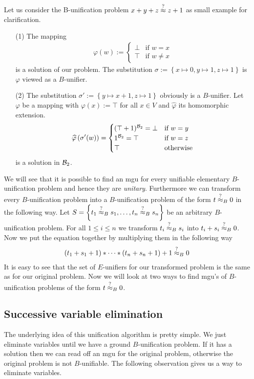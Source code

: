 	Let us consider the B-unification problem $x+y+z\stackrel{?}{\approx} z+1$ as small example for clarification.
	\begin{itemize}
		\item[(1)]The mapping 
		      \begin{align*}
		      	\varphi(w):=\begin{cases}
		      	\bot & \text{if }w=x     \\
		      	\top & \text{if }w\neq x 
		      	\end{cases}
		      \end{align*}is a solution of our problem. The substitution $\sigma:=\left\lbrace x\mapsto0,y\mapsto1,z\mapsto1\right\rbrace$ is $\varphi$ viewed as a $B$-unifier.
		\item[(2)]The substitution $\sigma':=\left\lbrace y\mapsto x+1,z\mapsto 1\right\rbrace $ obviously is a $B$-unifier. Let $\varphi$ be a mapping with $\varphi(x):=\top$ for all $x\in V$ and $\widehat{\varphi}$ its homomorphic extension.
		      \begin{align*}
		      	\widehat{\varphi}\left(\sigma'(w)\right)=\begin{cases}
		      	(\top+1)^{\mathcal{B}_2}=\bot & \text{if } w=y   \\
		      	1^{\mathcal{B}_2}=\top        & \text{if } w=z   \\
		      	\top                & \text{otherwise} 
		      	\end{cases}
		      \end{align*}
		      is a solution in ${\mathcal{B}_2}$.
	\end{itemize}
	We will see that it is possible to find an mgu for every unifiable elementary $B$-unification problem and hence they are \emph{unitary}.
	Furthermore we can transform every $B$-unification problem into a $B$-unification problem of the form $t\stackrel{?}{\approx}_B0$ in the following way. Let $S=\left\lbrace t_1\stackrel{?}{\approx}_Bs_1,\dots,t_n\stackrel{?}{\approx}_Bs_n\right\rbrace$ be an arbitrary $B$-unification problem. For all $1\leq i\leq n$ we transform $t_i\stackrel{?}{\approx}_Bs_i$ into $t_i+s_i\stackrel{?}{\approx}_B0$. Now we put the equation together by multiplying them in the following way 
	\begin{align*}
		(t_1+s_1+1)*\dots*(t_n+s_n+1)+1\stackrel{?}{\approx}_B0 
	\end{align*}
	It is easy to see that the set of $E$-unifiers for our transformed problem is the same as for our original problem. Now we will look at two ways to find mgu's of $B$-unification problems of the form $t\stackrel{?}{\approx}_B0$.
	\subsection{Successive variable elimination}
	The underlying idea of this unification algorithm is pretty simple. We just eliminate variables until we have a ground $B$-unification problem. If it has a solution then we can read off an mgu for the original problem, otherwise the original problem is not $B$-unifiable. The following observation gives us a way to eliminate variables.
			
